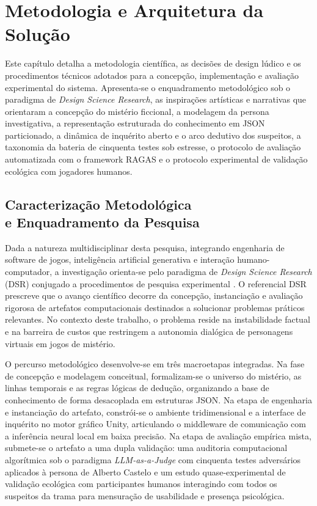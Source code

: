 \chapter{Metodologia e Arquitetura da Solução}
\label{cap:metodologia}

Este capítulo detalha a metodologia científica, as decisões de design lúdico e os procedimentos técnicos adotados para a concepção, implementação e avaliação experimental do sistema. Apresenta-se o enquadramento metodológico sob o paradigma de \textit{Design Science Research}, as inspirações artísticas e narrativas que orientaram a concepção do mistério ficcional, a modelagem da persona investigativa, a representação estruturada do conhecimento em JSON particionado, a dinâmica de inquérito aberto e o arco dedutivo dos suspeitos, a taxonomia da bateria de cinquenta testes sob estresse, o protocolo de avaliação automatizada com o framework RAGAS e o protocolo experimental de validação ecológica com jogadores humanos.

\section[Caracterização Metodológica e Enquadramento]{Caracterização Metodológica\\e Enquadramento da Pesquisa}
\label{sec:met_enquadramento}

Dada a natureza multidisciplinar desta pesquisa, integrando engenharia de software de jogos, inteligência artificial generativa e interação humano-computador, a investigação orienta-se pelo paradigma de \textit{Design Science Research} (DSR) \cite{hevner2004design} conjugado a procedimentos de pesquisa experimental \cite{creswell2014research}. O referencial DSR prescreve que o avanço científico decorre da concepção, instanciação e avaliação rigorosa de artefatos computacionais destinados a solucionar problemas práticos relevantes. No contexto deste trabalho, o problema reside na instabilidade factual e na barreira de custos que restringem a autonomia dialógica de personagens virtuais em jogos de mistério.

O percurso metodológico desenvolve-se em três macroetapas integradas. Na fase de concepção e modelagem conceitual, formalizam-se o universo do mistério, as linhas temporais e as regras lógicas de dedução, organizando a base de conhecimento de forma desacoplada em estruturas JSON. Na etapa de engenharia e instanciação do artefato, constrói-se o ambiente tridimensional e a interface de inquérito no motor gráfico Unity, articulando o middleware de comunicação com a inferência neural local em baixa precisão. Na etapa de avaliação empírica mista, submete-se o artefato a uma dupla validação: uma auditoria computacional algorítmica sob o paradigma \textit{LLM-as-a-Judge} com cinquenta testes adversários aplicados à persona de Alberto Castelo e um estudo quase-experimental de validação ecológica com participantes humanos interagindo com todos os suspeitos da trama para mensuração de usabilidade e presença psicológica.


